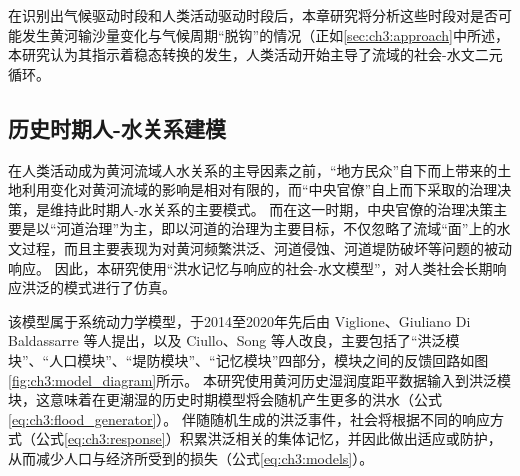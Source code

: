 在识别出气候驱动时段和人类活动驱动时段后，本章研究将分析这些时段对是否可能发生黄河输沙量变化与气候周期“脱钩”的情况（正如\ref{sec:ch3:approach}中所述，本研究认为其指示着稳态转换的发生，人类活动开始主导了流域的社会-水文二元循环。

\subsection{历史时期人-水关系建模}

在人类活动成为黄河流域人水关系的主导因素之前，“地方民众”自下而上带来的土地利用变化对黄河流域的影响是相对有限的，而“中央官僚”自上而下采取的治理决策，是维持此时期人-水关系的主要模式。
而在这一时期，中央官僚的治理决策主要是以“河道治理”为主，即以河道的治理为主要目标，不仅忽略了流域“面”上的水文过程，而且主要表现为对黄河频繁洪泛、河道侵蚀、河道堤防破坏等问题的被动响应。
因此，本研究使用“洪水记忆与响应的社会-水文模型”，对人类社会长期响应洪泛的模式进行了仿真。

该模型属于系统动力学模型，于2014至2020年先后由 Viglione、Giuliano Di Baldassarre 等人提出，以及 Ciullo、Song 等人改良，主要包括了“洪泛模块”、“人口模块”、“堤防模块”、“记忆模块”四部分，模块之间的反馈回路如图\ref{fig:ch3:model_diagram}所示。 %
本研究使用黄河历史湿润度距平数据输入到洪泛模块，这意味着在更潮湿的历史时期模型将会随机产生更多的洪水（公式\ref{eq:ch3:flood_generator}）。
伴随随机生成的洪泛事件，社会将根据不同的响应方式（公式\ref{eq:ch3:response}）积累洪泛相关的集体记忆，并因此做出适应或防护，从而减少人口与经济所受到的损失（公式\ref{eq:ch3:models}）。

